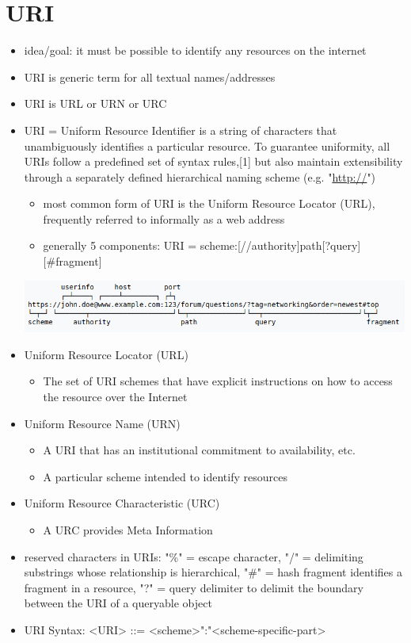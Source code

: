 \documentclass[11pt]{article}
\begin{document}
\section{URI}
\label{sec:org4a22e22}
\begin{itemize}
\item idea/goal: it must be possible to identify any resources on the internet
\item URI is generic term for all textual names/addresses
\item URI is URL or URN or URC
\item URI = Uniform Resource Identifier is a string of characters that unambiguously identifies a particular resource. To guarantee uniformity, all URIs follow a predefined set of syntax rules,[1] but also maintain extensibility through a separately defined hierarchical naming scheme (e.g. "\url{http://}")
\begin{itemize}
\item most common form of URI is the Uniform Resource Locator (URL), frequently referred to informally as a web address
\item generally 5 components: URI = scheme:[//authority]path[?query][\#fragment]
\end{itemize}
\begin{center}
\includegraphics[width=.9\linewidth]{./uri-example.png}
\label{org94a6712}
\end{center}
\item Uniform Resource Locator (URL)
\begin{itemize}
\item The set of URI schemes that have explicit instructions on how to access the resource over the Internet
\end{itemize}
\item Uniform Resource Name (URN)
\begin{itemize}
\item A URI that has an institutional commitment to availability, etc.
\item A particular scheme intended to identify resources
\end{itemize}
\item Uniform Resource Characteristic (URC)
\begin{itemize}
\item A URC provides Meta Information
\end{itemize}
\item reserved characters in URIs: "\%" = escape character, "/" = delimiting substrings whose relationship is hierarchical, "\#" = hash fragment identifies a fragment in a resource, "?" = query delimiter to delimit the boundary between the URI of a queryable object
\item URI Syntax: <URI> ::= <scheme>":"<scheme-specific-part>
\end{itemize}
\end{document}
